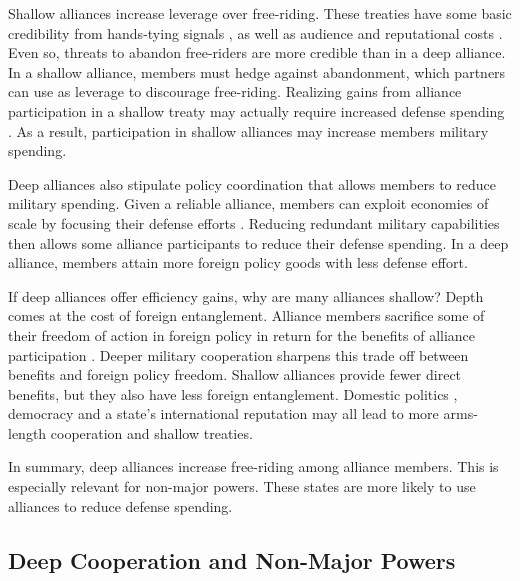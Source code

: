 \documentclass[12pt]{article}
\begin{document}
Shallow alliances increase leverage over free-riding. 
These treaties have some basic credibility from hands-tying signals \citep{Fearon1997}, as well as audience \cite{Morrow2000} and reputational costs \citep{Gibler2008, Crescenzietal2012}.
Even so, threats to abandon free-riders are more credible than in a deep alliance.  
In a shallow alliance, members must hedge against abandonment, which partners can use as leverage to discourage free-riding. 
Realizing gains from alliance participation in a shallow treaty may actually require increased defense spending \citep{NiouZeigler2019}.
As a result, participation in shallow alliances may increase members military spending. 


Deep alliances also stipulate policy coordination that allows members to reduce military spending. 
Given a reliable alliance, members can exploit economies of scale by focusing their defense efforts \citep{Leeds2003a}. 
Reducing redundant military capabilities then allows some alliance participants to reduce their defense spending. 
In a deep alliance, members attain more foreign policy goods with less defense effort. 


If deep alliances offer efficiency gains, why are many alliances shallow? 
Depth comes at the cost of foreign entanglement. 
Alliance members sacrifice some of their freedom of action in foreign policy in return for the benefits of alliance participation \citep{Altfield1984, Snyder1997}.
Deeper military cooperation sharpens this trade off between benefits and foreign policy freedom. 
Shallow alliances provide fewer direct benefits, but they also have less foreign entanglement.
Domestic politics \citep{Davis2004}, democracy \citep{Chibaetal2015} and a state's international reputation \citep{Mattes2012} may all lead to more arms-length cooperation and shallow treaties. 



In summary, deep alliances increase free-riding among alliance members. 
This is especially relevant for non-major powers.
These states are more likely to use alliances to reduce defense spending. 


\subsection{Deep Cooperation and Non-Major Powers} 
\end{document}
